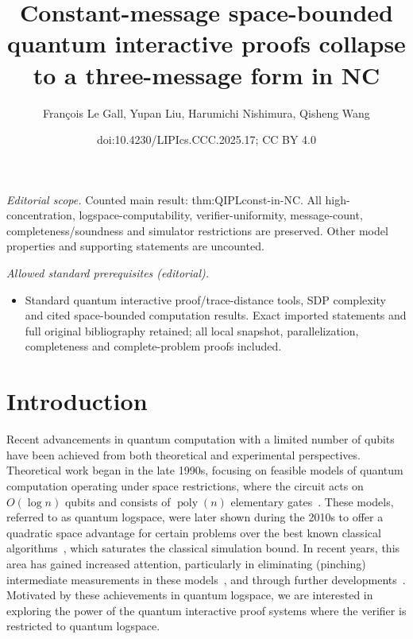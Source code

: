 \documentclass[10pt,a4paper]{article}
\title{Constant-message space-bounded quantum interactive proofs collapse to a three-message form in NC}
\author{François Le Gall, Yupan Liu, Harumichi Nishimura, Qisheng Wang}
\date{doi:10.4230/LIPIcs.CCC.2025.17; CC BY 4.0}
\numberwithin{equation}{section}
\numberwithin{figure}{section}
\DeclareMathOperator\poly{poly}
\begin{document}
\maketitle
\noindent\textit{Editorial scope.} Counted main result: thm:QIPLconst-in-NC. All high-concentration, logspace-computability, verifier-uniformity, message-count, completeness/soundness and simulator restrictions are preserved. Other model properties and supporting statements are uncounted.\par\medskip
\noindent\textit{Allowed standard prerequisites (editorial).}\begin{itemize}
\item Standard quantum interactive proof/trace-distance tools, SDP complexity and cited space-bounded computation results. Exact imported statements and full original bibliography retained; all local snapshot, parallelization, completeness and complete-problem proofs included.
\end{itemize}\medskip
\section{Introduction}

Recent advancements in quantum computation with a limited number of qubits have been achieved from both theoretical and experimental perspectives. Theoretical work began in the late 1990s, focusing on feasible models of quantum computation operating under space restrictions, where the circuit acts on $O(\log n)$ qubits and consists of $\poly(n)$ elementary gates~\cite{Wat99,Wat03}. These models, referred to as quantum logspace, were later shown during the 2010s to offer a quadratic space advantage for certain problems over the best known classical algorithms~\cite{TS13,FL18}, which saturates the classical simulation bound. In recent years, this area has gained increased attention, particularly in eliminating (pinching) intermediate measurements in these models~\cite{FR21,GRZ21}, and through further developments~\cite{GR22,Zhandry24}. Motivated by these achievements in quantum logspace, we are interested in exploring the power of the quantum interactive proof systems where the verifier is restricted to quantum logspace. 
\end{document}
